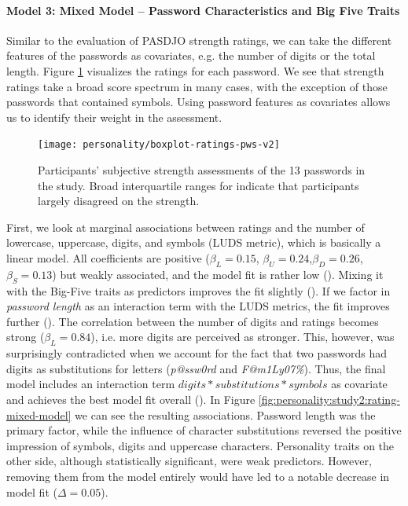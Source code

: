 \paragraph{Model 3: Mixed Model -- Password Characteristics and Big Five Traits}
Similar to the evaluation of PASDJO strength ratings, we can take the different features of the passwords as covariates, e.g. the number of digits or the total length. Figure \ref{fig:personality:study2:boxplot-ratings-pws} visualizes the ratings for each password. We see that strength ratings take a broad score spectrum in many cases, with the exception of those passwords that contained symbols. Using password features as covariates allows us to identify their weight in the assessment. 

\begin{figure}[htbp]
	\centering
	\texttt{[image: personality/boxplot-ratings-pws-v2]}
	\caption{\label{fig:personality:study2:boxplot-ratings-pws}Participants' subjective strength assessments of the 13 passwords in the study. Broad interquartile ranges for indicate that participants largely disagreed on the strength.}
\end{figure}

\makeatletter
First, we look at marginal associations between ratings and the number of lowercase, uppercase, digits, and symbols (LUDS metric), which is basically a linear model. All coefficients are positive ($\beta_{L} = 0.15$, $\beta_{U} = 0.24$,$\beta_{D} = 0.26$,$\beta_{S} = 0.13$) but weakly associated, and the model fit is rather low (). Mixing it with the Big-Five traits as predictors improves the fit slightly (). If we factor in \textit{password length} as an interaction term with the LUDS metrics, the fit improves further (). The correlation between the number of digits and ratings becomes strong ($\beta_{L} = 0.84$), i.e. more digits are perceived as stronger. This, however, was surprisingly contradicted when we account for the fact that two passwords had digits as substitutions for letters (\textit{p@ssw0rd} and \textit{F@m1Ly07\%}). Thus, the final model includes an interaction term $digits*substitutions*symbols$ as covariate and achieves the best model fit overall (). In Figure \ref{fig:personality:study2:rating-mixed-model} we can see the resulting associations. Password length was the primary factor, while the influence of character substitutions reversed the positive impression of symbols, digits and uppercase characters.
Personality traits on the other side, although statistically significant, were weak predictors. However, removing them from the model entirely would have led to a notable decrease in model fit ($\Delta=0.05$). 

